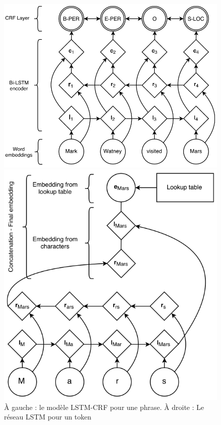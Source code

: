 \documentclass[citation\_needed]{subfiles}
\begin{document}
\begin{figure}[ht!]
\begin{minipage}{0.49\linewidth}
    \centering
    \includegraphics[scale=0.35]{images/LSTM/LSTM-CRF}
\end{minipage}
\begin{minipage}{0.49\linewidth}
    \centering
    \includegraphics[scale=0.4]{images/LSTM/LSTM-char}
\end{minipage}
\caption{À gauche : le modèle LSTM-CRF pour une phrase. À droite : Le réseau LSTM pour un token}
\label{fig:lstm-CRF}
\end{figure}
\end{document}
